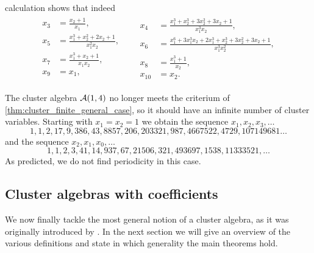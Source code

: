 \begin{example}
	calculation shows that indeed
	\begin{align*}
		\begin{aligned}
			x_{3} & =\frac{x_{2} + 1}{x_{1}},                                     \\
			x_{5} & =\frac{x_{1}^{3} + x_{2}^{2} + 2 x_{2} + 1}{x_{1}^{2} x_{2}}, \\
			x_{7} & =\frac{x_{1}^{3} + x_{2} + 1}{x_{1} x_{2}},                   \\
			x_{9} & =x_{1},                                                       \\
		\end{aligned}
		 &  &
		\begin{aligned}
			x_{4}  & =\frac{x_{1}^{3} + x_{2}^{3} + 3 x_{2}^{2} + 3 x_{2} + 1}{x_{1}^{3} x_{2}},                                       \\
			x_{6}  & =\frac{x_{1}^{6} + 3 x_{1}^{3} x_{2} + 2 x_{1}^{3} + x_{2}^{3} + 3 x_{2}^{2} + 3 x_{2} + 1}{x_{1}^{3} x_{2}^{2}}, \\
			x_{8}  & =\frac{x_{1}^{3} + 1}{x_{2}},                                                                                     \\
			x_{10} & =x_{2}.
		\end{aligned}
	\end{align*}

	The cluster algebra $\mathcal{A}(1,4)$ no longer meets the criterium of
	\cref{thm:cluster_finite_general_case}, so it should have an infinite number of cluster
	variables. Starting with $x_1 = x_2 = 1$ we obtain the sequence $x_1, x_2, x_3, \dots$
	\begin{equation*}
		1,1,2,17,9,386,43,8857,206,203321,987,4667522,4729,107149681\dots
	\end{equation*}
	and the sequence $x_2, x_1, x_0, \dots$
	\begin{equation*}
		1,1,2,3,41,14,937,67,21506,321,493697,1538,11333521,\dots
	\end{equation*}
	As predicted, we do not find periodicity in this case.
\end{example}

\subsection{Cluster algebras with coefficients}\label{sec:cluster_algebras_coefficients}

We now finally tackle the most general notion of a cluster algebra, as it was
originally introduced by \textcite{FominZelevinsky2002CAF}. In the next section we will
give an overview of the various definitions and state in which generality the main
theorems hold.

